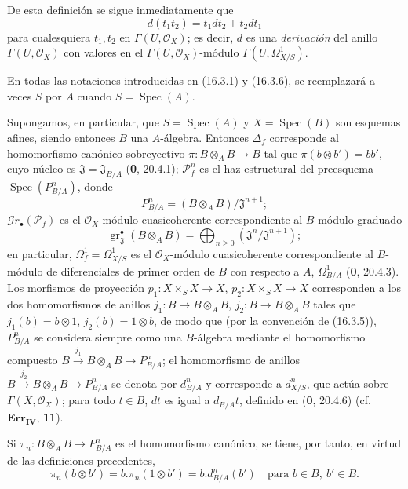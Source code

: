 De esta definición se sigue inmediatamente que
\[
  d(t_1t_2)=t_1dt_2+t_2dt_1
  \tag{16.3.6.1}
  \label{IV.16.3.6.1}
\]
para cualesquiera $t_1,t_2$ en $\Gamma(U,\mathcal{O}_X)$; es decir, $d$
es una \emph{derivación} del anillo $\Gamma(U,\mathcal{O}_X)$ con valores en el
$\Gamma(U,\mathcal{O}_X)$-módulo $\Gamma(U,\varOmega_{X/S}^1)$.

En todas las notaciones introducidas en (16.3.1) y (16.3.6), se reemplazará
a veces $S$ por $A$ cuando $S=\operatorname{Spec}(A)$.

\begin{env}[16.3.7]
\label{IV.16.3.7}
Supongamos, en particular, que $S=\operatorname{Spec}(A)$ y
$X=\operatorname{Spec}(B)$ son esquemas afines, siendo entonces $B$ una
$A$-álgebra. Entonces $\Delta_f$ corresponde al homomorfismo canónico sobreyectivo
$\pi:B\otimes_A B\to B$ tal que $\pi(b\otimes b')=bb'$, cuyo núcleo es
$\mathfrak{J}=\mathfrak{J}_{B/A}$ (\textbf 0, 20.4.1); $\mathscr{P}_f^n$ es el haz
estructural del preesquema $\operatorname{Spec}(P_{B/A}^n)$, donde
\[
  P_{B/A}^n=(B\otimes_A B)/\mathfrak{J}^{n+1};
\]
$\mathscr{G}r_\bullet(\mathscr{P}_f)$ es el $\mathcal{O}_X$-módulo
cuasicoherente correspondiente al $B$-módulo graduado
\[
  \operatorname{gr}_{\mathfrak{J}}^\bullet(B\otimes_A B)
  =\bigoplus_{n\geq 0}(\mathfrak{J}^n/\mathfrak{J}^{n+1});
\]
en particular, $\varOmega_f^1=\varOmega_{X/S}^1$ es el $\mathcal{O}_X$-módulo
cuasicoherente correspondiente al $B$-módulo de diferenciales de primer orden de $B$ con
respecto a $A$, $\Omega_{B/A}^1$ (\textbf 0, 20.4.3). Los morfismos de proyección
$p_1:X\times_S X\to X$, $p_2:X\times_S X\to X$ corresponden a los dos
homomorfismos de anillos $j_1:B\to B\otimes_A B$, $j_2:B\to B\otimes_A B$
tales que $j_1(b)=b\otimes 1$, $j_2(b)=1\otimes b$, de modo que (por la
convención de (16.3.5)), $P_{B/A}^n$ se considera siempre como una
$B$-álgebra mediante el homomorfismo compuesto
$B\xrightarrow{j_1}B\otimes_A B\to P_{B/A}^n$; el homomorfismo de anillos
$B\xrightarrow{j_2}B\otimes_A B\to P_{B/A}^n$ se denota por $d_{B/A}^n$ y corresponde
a $d_{X/S}^n$, que actúa sobre $\Gamma(X,\mathcal{O}_X)$; para todo $t\in B$, $dt$
es igual a $d_{B/A}t$, definido en (\textbf 0, 20.4.6) (cf. $\mathbf{Err}_{\mathbf{IV}}$,
\textbf{11}).

Si $\pi_n:B\otimes_A B\to P_{B/A}^n$ es el homomorfismo canónico, se tiene, por tanto,
en virtud de las definiciones precedentes,
\[
  \pi_n(b\otimes b')=b.\pi_n(1\otimes b')=b.d_{B/A}^n(b')
  \quad\text{para }b\in B,\ b'\in B.
  \tag{16.3.7.1}
  \label{IV.16.3.7.1}
\]
\end{env}

